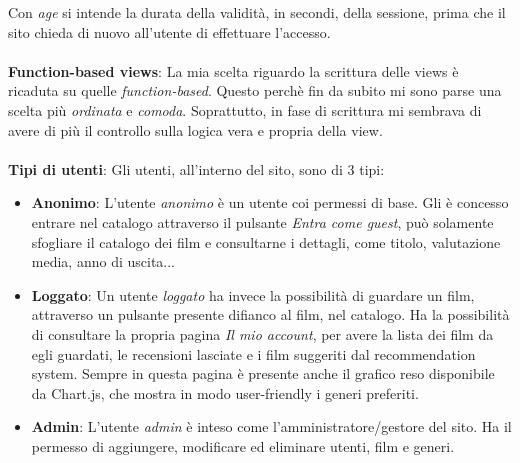 \documentclass[12pt]{article}
\begin{document}
	\noindent Con \textit{age} si intende la durata della validità, in secondi, della sessione, prima che il sito chieda di nuovo all'utente di effettuare l'accesso. \\ \\
	
	\noindent \textbf{Function-based views}: La mia scelta riguardo la scrittura delle views è ricaduta su quelle \textit{function-based}. Questo perchè fin da subito mi sono parse una scelta più \textit{ordinata} e \textit{comoda}. Soprattutto, in fase di scrittura mi sembrava di avere di più il controllo sulla logica vera e propria della view. \\ \\
	
	\noindent \textbf{Tipi di utenti}: Gli utenti, all'interno del sito, sono di 3 tipi:
	\begin{itemize}
		\item \textbf{Anonimo}: L'utente \textit{anonimo} è un utente coi permessi di base. Gli è concesso entrare nel catalogo attraverso il pulsante \textit{Entra come guest}, può solamente sfogliare il catalogo dei film e consultarne i dettagli, come titolo, valutazione media, anno di uscita...
		 
		\item \textbf{Loggato}: Un utente \textit{loggato} ha invece la possibilità di guardare un film, attraverso un pulsante presente difianco al film, nel catalogo. Ha la possibilità di consultare la propria pagina \textit{Il mio account}, per avere la lista dei film da egli guardati, le recensioni lasciate e i film suggeriti dal recommendation system. Sempre in questa pagina è presente anche il grafico reso disponibile da Chart.js, che mostra in modo user-friendly i generi preferiti.
		\item \textbf{Admin}: L'utente \textit{admin} è inteso come l'amministratore/gestore del sito. Ha il permesso di aggiungere, modificare ed eliminare utenti, film e generi. 
	\end{itemize}
\end{document}
